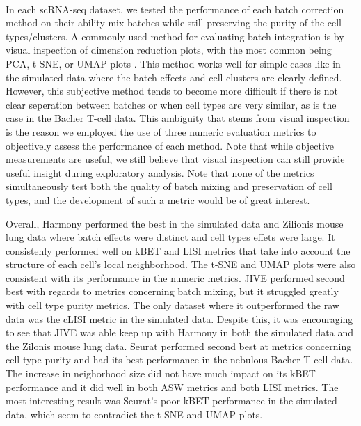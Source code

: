 \documentclass[
12pt, %
letterpaper, %
oneside, %
headinclude,footinclude, %
BCOR5mm, %
]{scrartcl}
\begin{document}
\paragraph*{}
In each scRNA-seq dataset, we tested the performance of each batch correction method on their ability mix batches while still preserving the purity of the cell types/clusters. A commonly used method for evaluating batch integration is by visual inspection of dimension reduction plots, with the most common being PCA, t-SNE, or UMAP plots \citep{tran2020benchmark}. This method works well for simple cases like in the simulated data where the batch effects and cell clusters are clearly defined. However, this subjective method tends to become more difficult if there is not clear seperation between batches or when cell types are very similar, as is the case in the Bacher T-cell data. This ambiguity that stems from visual inspection is the reason we employed the use of three numeric evaluation metrics to objectively assess the performance of each method. Note that while objective measurements are useful, we still believe that visual inspection can still provide useful insight during exploratory analysis. Note that none of the metrics simultaneously test both the quality of batch mixing and preservation of cell types, and the development of such a metric would be of great interest.

Overall, Harmony performed the best in the simulated data and Zilionis mouse lung data where batch effects were distinct and cell types effets were large. It consistenly performed well on kBET and LISI metrics that take into account the structure of each cell's local neighborhood. The t-SNE and UMAP plots were also consistent with its performance in the numeric metrics. JIVE performed second best with regards to metrics concerning batch mixing, but it struggled greatly with cell type purity metrics. The only dataset where it outperformed the raw data was the cLISI metric in the simulated data. Despite this, it was encouraging to see that JIVE was able keep up with Harmony in both the simulated data and the Zilonis mouse lung data. Seurat performed second best at metrics concerning cell type purity and had its best performance in the nebulous Bacher T-cell data. The increase in neighorhood size did not have much impact on its kBET performance and it did well in both ASW metrics and both LISI metrics. The most interesting result was Seurat's poor kBET performance in the simulated data, which seem to contradict the t-SNE and UMAP plots. 
\end{document}

